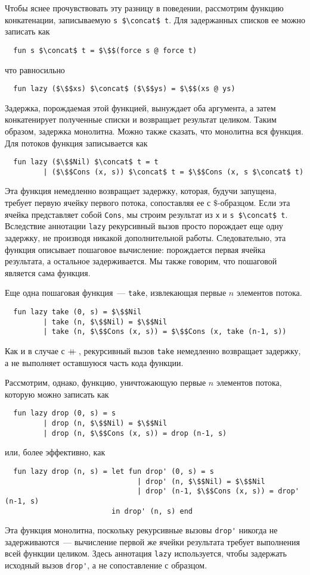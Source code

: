 Чтобы яснее прочувствовать эту разницу в поведении, рассмотрим функцию
конкатенации, записываемую \lstinline!s $\concat$ t!. Для задержанных
списков ее можно записать как
\begin{lstlisting}
  fun s $\concat$ t = $\$$(force s @ force t)
\end{lstlisting}
что равносильно
\begin{lstlisting}
  fun lazy ($\$$xs) $\concat$ ($\$$ys) = $\$$(xs @ ys)
\end{lstlisting}
Задержка, порождаемая этой функцией, вынуждает оба аргумента, а затем
конкатенирует полученные списки и возвращает результат целиком. Таким
образом, задержка монолитна. Можно также сказать, что монолитна вся
функция. Для потоков функция записывается как
\begin{lstlisting}
  fun lazy ($\$$Nil) $\concat$ t = t
         | ($\$$Cons (x, s)) $\concat$ t = $\$$Cons (x, s $\concat$ t)
\end{lstlisting}
Эта функция немедленно возвращает задержку, которая, будучи запущена,
требует первую ячейку первого потока, сопоставляя ее с
$\$$-образцом. Если эта ячейка представляет собой \lstinline!Cons!, мы
строим результат из \lstinline!x! и \lstinline!s $\concat$ t!. 
Вследствие аннотации \lstinline!lazy! рекурсивный вызов просто
порождает еще одну задержку, не производя никакой дополнительной
работы. Следовательно, эта функция описывает пошаговое вычисление:
порождается первая ячейка результата, а остальное задерживается. Мы
также говорим, что пошаговой является сама функция.

Еще одна пошаговая функция~--- \lstinline!take!, извлекающая первые
$n$ элементов потока.
\begin{lstlisting}
  fun lazy take (0, s) = $\$$Nil
         | take (n, $\$$Nil) = $\$$Nil
         | take (n, $\$$Cons (x, s)) = $\$$Cons (x, take (n-1, s))
\end{lstlisting}
Как и в случае с $+\!\!\!+\,$, рекурсивный вызов \lstinline!take!
немедленно возвращает задержку, а не выполняет оставшуюся часть кода
функции.

Рассмотрим, однако, функцию, уничтожающую первые $n$ элементов потока,
которую можно записать как
\begin{lstlisting}
  fun lazy drop (0, s) = s
         | drop (n, $\$$Nil) = $\$$Nil
         | drop (n, $\$$Cons (x, s)) = drop (n-1, s)
\end{lstlisting}
или, более эффективно, как
\begin{lstlisting}
  fun lazy drop (n, s) = let fun drop' (0, s) = s
                               | drop' (n, $\$$Nil) = $\$$Nil
                               | drop' (n-1, $\$$Cons (x, s)) = drop' (n-1, s)
                         in drop' (n, s) end
\end{lstlisting}
Эта функция монолитна, поскольку рекурсивные вызовы \lstinline!drop'!
никогда не задерживаются~--- вычисление первой же ячейки результата
требует выполнения всей функции целиком. Здесь аннотация
\lstinline!lazy! используется, чтобы задержать исходный вызов
\lstinline!drop'!, а не сопоставление с образцом.

